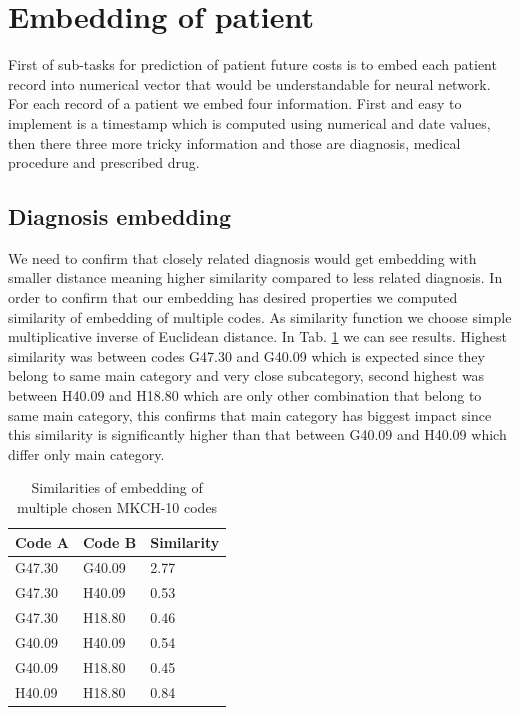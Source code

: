 
\section{Embedding of patient}
\label{embeddingRes}

First of sub-tasks for prediction of patient future costs is to embed each patient record into numerical vector that would be understandable for neural network. For each record of a patient we embed four information. First and easy to implement is a timestamp which is computed using numerical and date values, then there three more tricky information and those are diagnosis, medical procedure and prescribed drug. 


\subsection{Diagnosis embedding}

We need to confirm that closely related diagnosis would get embedding with smaller distance meaning higher similarity compared to less related diagnosis.
In order to confirm that our embedding has desired properties we computed similarity of embedding of multiple codes. As similarity function we choose simple multiplicative inverse of Euclidean distance. In Tab. \ref{tab:diag_emb_show} we can see results. Highest similarity was between codes G47.30 and G40.09 which is expected since they belong to same main category and very close subcategory, second highest was between H40.09 and H18.80 which are only other combination that belong to same main category, this confirms that main category has biggest impact since this similarity is significantly higher than that between G40.09 and H40.09 which differ only main category.

\begin{table}[!h]
	\centering
	\begin{tabular}{|l|l|l|}
		\hline
		Code A & Code B & Similarity \\ \hline
		G47.30 & G40.09 & 2.77       \\ \hline
		G47.30 & H40.09 & 0.53       \\ \hline
		G47.30 & H18.80 & 0.46       \\ \hline
		G40.09 & H40.09 & 0.54       \\ \hline
		G40.09 & H18.80 & 0.45       \\ \hline
		H40.09 & H18.80 & 0.84       \\ \hline
	\end{tabular}
	\caption{Similarities of embedding of multiple chosen MKCH-10 codes}
	\label{tab:diag_emb_show}
\end{table}  

